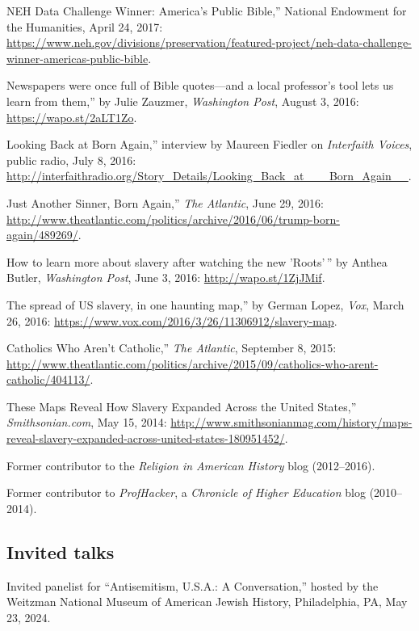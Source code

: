 \documentclass[11pt]{article}
\begin{document}
\noindent{}NEH Data Challenge Winner: America's Public Bible,'' National Endowment for the Humanities, April 24, 2017: \url{https://www.neh.gov/divisions/preservation/featured-project/neh-data-challenge-winner-americas-public-bible}.

\noindent{}Newspapers were once full of Bible quotes---and a local professor's tool lets us learn from them,'' by Julie Zauzmer, \emph{Washington Post}, August 3, 2016: \url{https://wapo.st/2aLT1Zo}.

\noindent{}Looking Back at Born Again,'' interview by Maureen Fiedler on \emph{Interfaith Voices}, public radio, July 8, 2016: \url{http://interfaithradio.org/Story_Details/Looking_Back_at___Born_Again__}.

\noindent{}Just Another Sinner, Born Again,'' \emph{The Atlantic}, June 29, 2016: \url{http://www.theatlantic.com/politics/archive/2016/06/trump-born-again/489269/}.

\noindent{}How to learn more about slavery after watching the new 'Roots'\,'' by Anthea Butler, \emph{Washington Post}, June 3, 2016: \url{http://wapo.st/1ZjJMif}.

\noindent{}The spread of US slavery, in one haunting map,'' by German Lopez, \emph{Vox}, March 26, 2016: \url{https://www.vox.com/2016/3/26/11306912/slavery-map}.

\noindent{}Catholics Who Aren't Catholic,'' \emph{The Atlantic}, September 8, 2015:  \url{http://www.theatlantic.com/politics/archive/2015/09/catholics-who-arent-catholic/404113/}.

\noindent{}These Maps Reveal How Slavery Expanded Across the United States,'' \emph{Smithsonian.com}, May 15, 2014: \url{http://www.smithsonianmag.com/history/maps-reveal-slavery-expanded-across-united-states-180951452/}.

Former contributor to the \emph{Religion in American History} blog (2012--2016).

Former contributor to \emph{ProfHacker}, a \emph{Chronicle of Higher Education} blog (2010--2014). 

\subsection{Invited talks}\label{Invited talks}

Invited panelist for ``Antisemitism, U.S.A.: A Conversation,'' hosted by the 
Weitzman National Museum of American Jewish History, Philadelphia, PA, May 23, 
2024.
\end{document}
